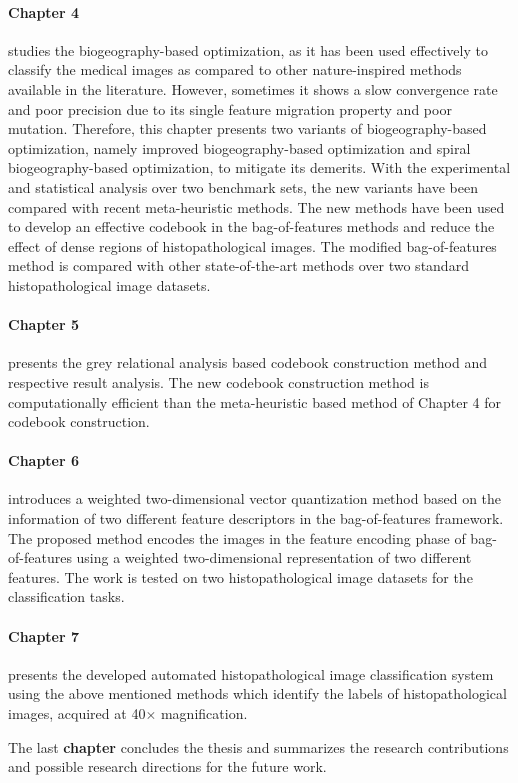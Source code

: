 \paragraph{Chapter 4} studies the biogeography-based optimization, as it has been used effectively to classify the medical images as compared to other nature-inspired methods available in the literature. However, sometimes it shows a slow convergence rate and poor precision due to its single feature migration property and poor mutation. Therefore, this chapter presents two variants of biogeography-based optimization, namely improved biogeography-based optimization and spiral biogeography-based optimization, to mitigate its demerits. With the experimental and statistical analysis over two benchmark sets, the new variants have been compared with recent meta-heuristic methods. The new methods have been used to develop an effective codebook in the bag-of-features methods and reduce the effect of dense regions of histopathological images. The modified bag-of-features method is compared with other state-of-the-art methods over two standard histopathological image datasets.

\paragraph{Chapter 5} presents the grey relational analysis based codebook construction method and respective result analysis. The new codebook construction method is computationally efficient than the meta-heuristic based method of Chapter 4 for codebook construction.

\paragraph{Chapter 6} introduces a weighted two-dimensional vector quantization method based on the information of two different feature descriptors in the bag-of-features framework. The proposed method encodes the images in the feature encoding phase of bag-of-features using a weighted two-dimensional representation of two different features. The work is tested on two histopathological image datasets for the classification tasks.

\paragraph{Chapter 7} presents the developed automated histopathological image classification system using the above mentioned methods which identify the labels of histopathological images, acquired at 40$\times$ magnification. 

The last \textbf{chapter} concludes the thesis and summarizes the research contributions and possible research directions for the future  work. 
